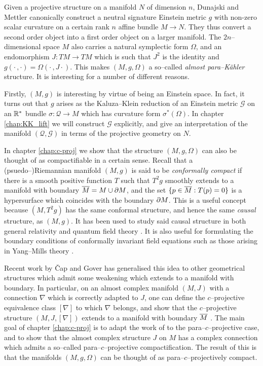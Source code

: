 Given a projective structure on a manifold $N$ of dimension $n$,
Dunajski and Mettler \cite{DM} canonically construct a neutral signature Einstein metric $g$ with non-zero
scalar curvature on a certain rank $n$ affine bundle $M\rightarrow N$. They thus convert a second order object into a first order object on a larger manifold.
The $2n$--dimensional space $M$ also carries a natural symplectic form $\Omega$, and an endomorphism $J:TM\rightarrow TM$ which is such that $J^2$ is the identity and $g(\cdot\,,\cdot)=\Omega(\cdot\,,J\cdot)$. This makes $(M,g,\Omega)$ a so--called \textit{almost para--K\"ahler} structure. It is interesting for a number of different reasons.

Firstly, $(M,g)$ is interesting by virtue of being an Einstein
space. In fact, it turns out that $g$ arises as the Kaluza--Klein reduction of an Einstein metric $\mathcal{G}$ on an $\mathbb{R}^*$ bundle $\sigma:\mathcal{Q}\rightarrow M$ which has curvature form $\sigma^*(\Omega)$. In chapter \ref{chap:KK_lift} we will construct $\mathcal{G}$ explicitly, and give an interpretation of the manifold $(\mathcal{Q},\mathcal{G})$ in terms of the projective geometry on $N$.

In chapter \ref{chap:c-proj} we show that the structure $(M,g,\Omega)$ can also be thought of as compactifiable in a certain sense. Recall that a (psuedo--)Riemannian manifold $(M,g)$ is said to be \textit{conformally compact} if there is a smooth positive function $T$ such that $T^2g$ smoothly extends to a manifold with boundary $\overline{M}=M\cup\partial M$, and the set $\{p\in\overline{M}:T(p)=0\}$ is a hypersurface which coincides with the boundary $\partial M$.  This is a useful concept because $(M,T^2g)$ has the same conformal structure, and hence the same \textit{causal} structure, as $(M,g)$. It has been used to study said causal structure in both general relativity \cite{penrose65} and quantum field theory \cite{witten}. It is also useful for formulating the boundary conditions of conformally invariant field equations such as those arising in Yang--Mills theory \cite{uhlen}.

Recent work by \v Cap and Gover \cite{CG0,CG} has generalised this idea to other geometrical structures which admit some weakening which extends to a manifold with boundary. In particular, on an almost complex manifold $(M,J)$ with a connection $\nabla$ which is correctly adapted to $J$, one can define the $c$--projective equivalence class $[\nabla]$ to which $\nabla$ belongs, and show that the $c$--projective structure $(M,J,[\nabla])$ extends to a manifold with boundary $\overline{M}$ \cite{CG}. The main goal of chapter \ref{chap:c-proj} is to adapt the work of \cite{CG} to the para--$c$--projective case, and to show that the almost complex structure $J$ on $M$ has a complex connection which admits a so--called para--$c$--projective compactification. The result of this is that the manifolds $(M,g,\Omega)$ can be thought of as para--$c$--projectively compact.

